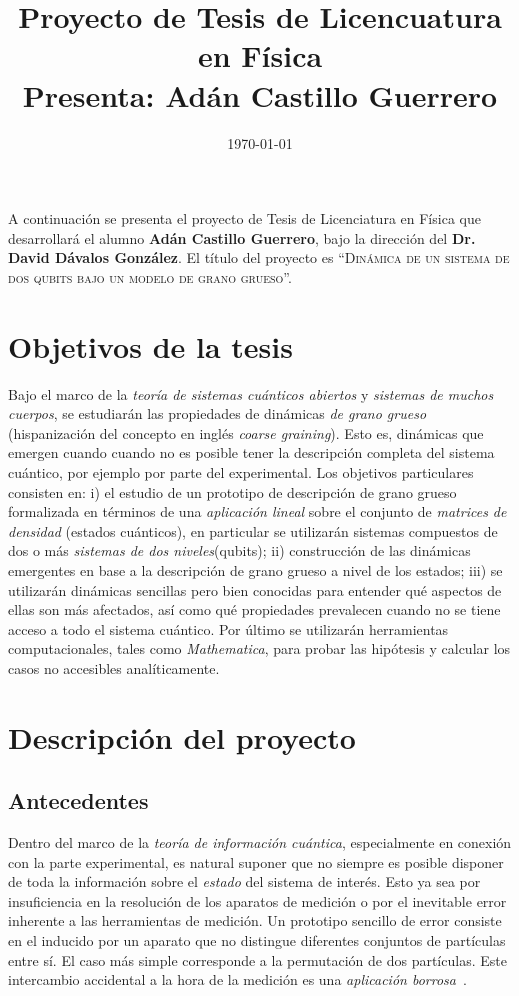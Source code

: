 \documentclass[10pt]{article}
\title{Proyecto de Tesis de Licencuatura en Física\\ {\large Presenta: Adán Castillo Guerrero}}
\date{\today}
\begin{document}
\maketitle
\thispagestyle{empty}
A continuación se presenta el proyecto de Tesis de Licenciatura en Física que desarrollará el alumno \textbf{Adán Castillo Guerrero}, bajo la dirección del \textbf{Dr. David Dávalos González}. El título del proyecto es ``\textsc{Dinámica de un sistema de dos qubits bajo un modelo de grano grueso}''.

\section{Objetivos de la tesis}
Bajo el marco de la \textit{teoría de sistemas cuánticos abiertos} y \textit{sistemas de muchos cuerpos}, se estudiarán las propiedades de dinámicas \textit{de grano grueso} (hispanización del concepto en inglés \textit{coarse graining}). Esto es, dinámicas que emergen cuando cuando no es posible tener la descripción completa del sistema cuántico, por ejemplo por parte del experimental. Los objetivos particulares consisten en: i) el estudio de un prototipo de descripción de grano grueso formalizada en términos de una \textit{aplicación lineal} sobre el conjunto de \textit{matrices de densidad} (estados cuánticos), en particular se utilizarán sistemas compuestos de dos o más \textit{sistemas de dos niveles}(qubits); ii) construcción de las dinámicas emergentes en base a la descripción de grano grueso a nivel de los estados; iii) se utilizarán dinámicas sencillas pero bien conocidas para entender qué aspectos de ellas son más afectados, así como qué propiedades prevalecen cuando no se tiene acceso a todo el sistema cuántico. Por último se utilizarán herramientas computacionales, tales como \textit{Mathematica}, para probar las hipótesis y calcular los casos no accesibles analíticamente.

\section{Descripción del proyecto}

\subsection{Antecedentes}
Dentro del marco de la \textit{teoría de información cuántica}, especialmente en conexión con la parte experimental, es natural suponer que no siempre es posible disponer de toda la información sobre el \textit{estado} del sistema de interés. Esto ya sea por insuficiencia en la resolución de los aparatos de medición o por el inevitable error inherente a las herramientas de medición. Un prototipo sencillo de error consiste en el inducido por un aparato que no distingue diferentes conjuntos de partículas entre sí. El caso más simple corresponde a la permutación de dos partículas. Este intercambio accidental a la hora de la medición es una \textit{aplicación borrosa}~\cite{FuzzyMeasurements}.
\end{document}
